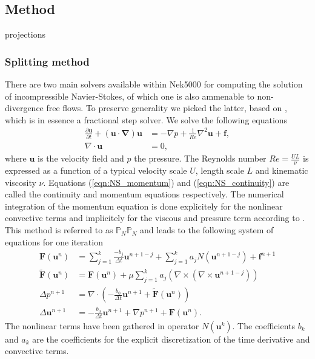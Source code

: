 \documentclass{sig-alternate}
\begin{document}
\subsection{Method}
projections

\subsubsection{Splitting method}
There are two main solvers available within Nek5000 for computing the solution of incompressible Navier-Stokes, of which one is also ammenable to non-divergence free flows. To preserve generality we picked the latter, based on \cite{Tomboulides1997}, which is in essence a fractional step solver. We solve the following equations
\begin{align}
 \frac{\partial \mathbf{u}}{\partial t} + (\mathbf{u \cdot \nabla}) \mathbf{u} & = - \nabla p + \frac{1}{Re} \nabla^2 \mathbf{u} + \mathbf{f} \label{eqn:NS_momentum},\\
 \nabla \cdot \mathbf{u} & = 0, \label{eqn:NS_continuity}
\end{align}
where $\mathbf{u}$ is the velocity field and $p$ the pressure. The Reynolds number $Re = \frac{U L}{\nu}$ is expressed as a function of a typical velocity scale $U$, length scale $L$ and kinematic viscosity $\nu$. Equations (\ref{eqn:NS_momentum})  and (\ref{eqn:NS_continuity}) are called the continuity and momentum equations respectively. The numerical integration of the momentum equation is done explicitely for the nonlinear convective terms and implicitely for the viscous and pressure term according to \cite{Tomboulides1997}. This method is referred to as $\mathbb{P}_N\mathbb{P}_N$ and leads to the following system of equations for one iteration
\begin {align}
 \mathbf{F} \left( \mathbf{u}^{n} \right) & = \sum_{j=1}^{k} \frac{-b_j}{\Delta t} \mathbf{u}^{n+1-j} + \sum_{j=1}^{k} a_j N \left( \mathbf{u}^{n+1-j} \right) +  \mathbf{f}^{n+1} \label{eqn:rhs1}\\
 \mathbf{\tilde{F}} \left( \mathbf{u}^{n} \right) & = \mathbf{F}\left(\mathbf{u}^{n}\right) + \mu \sum_{j=1}^{k} a_j \left( \nabla \times \left( \nabla \times \mathbf{u}^{n+1-j} \right) \right) \label{eqn:rhs2} \\
 \Delta p^{n+1} & = \nabla \cdot \left( -\frac{b_0}{\Delta t} \mathbf{u}^{n+1} + \mathbf{\tilde{F}} \left( \mathbf{u}^{n} \right) \right) \label{eqn:hmhz_pres}\\
 \Delta \mathbf{u}^{n+1} & = - \frac{b_0}{\Delta t} \mathbf{u}^{n+1} + \nabla p^{n+1} + \mathbf{F} \left( \mathbf{u}^{n} \right). \label{eqn:hmhz_vel}
\end {align}
The nonlinear terms have been gathered in operator $N \left( \mathbf{u}^{k} \right)$. The coefficients $b_k$ and $a_k$ are the coefficients for the explicit discretization of the time derivative and convective terms.
\end{document}
